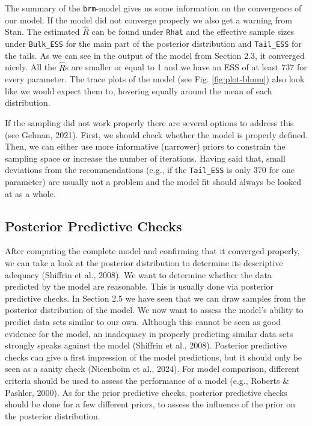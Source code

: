 \documentclass[
  doc,12pt,floatsintext]{apa7}
\begin{document}
The summary of the \texttt{brm}-model gives us some information on the convergence of our model. If the model did not converge properly we also get a warning from Stan. The estimated \(\hat{R}\) can be found under \texttt{Rhat} and the effective sample sizes under \texttt{Bulk\_ESS} for the main part of the posterior distribution and \texttt{Tail\_ESS} for the tails. As we can see in the output of the model from Section 2.3, it converged nicely. All the \(\hat{R}\)s are smaller or equal to 1 and we have an ESS of at least 737 for every parameter. The trace plots of the model (see Fig. \ref{fig:plot-blmm}) also look like we would expect them to, hovering equally around the mean of each distribution.

If the sampling did not work properly there are several options to address this (see Gelman, 2021). First, we should check whether the model is properly defined. Then, we can either use more informative (narrower) priors to constrain the sampling space or increase the number of iterations. Having said that, small deviations from the recommendations (e.g., if the \texttt{Tail\_ESS} is only 370 for one parameter) are usually not a problem and the model fit should always be looked at as a whole.

\subsection{Posterior Predictive Checks}\label{posterior-predictive-checks}

After computing the complete model and confirming that it converged properly, we can take a look at the posterior distribution to determine its descriptive adequacy (Shiffrin et al., 2008). We want to determine whether the data predicted by the model are reasonable. This is usually done via posterior predictive checks. In Section 2.5 we have seen that we can draw samples from the posterior distribution of the model. We now want to assess the model's ability to predict data sets similar to our own. Although this cannot be seen as good evidence for the model, an inadequacy in properly predicting similar data sets strongly speaks against the model (Shiffrin et al., 2008). Posterior predictive checks can give a first impression of the model predictions, but it should only be seen as a sanity check (Nicenboim et al., 2024). For model comparison, different criteria should be used to assess the performance of a model (e.g., Roberts \& Pashler, 2000). As for the prior predictive checks, posterior predictive checks should be done for a few different priors, to assess the influence of the prior on the posterior distribution.
\end{document}

